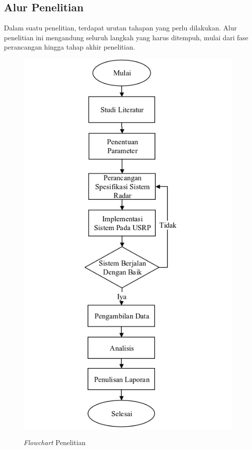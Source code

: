 \chapter{\babTiga}

\section{Alur Penelitian}
Dalam suatu penelitian, terdapat urutan tahapan yang perlu dilakukan. Alur penelitian ini mengandung seluruh langkah yang harus ditempuh, mulai dari fase perancangan hingga tahap akhir penelitian.
 \begin{figure}
	\begin{center}
		\includegraphics[scale=0.5]{pics/bab3/flowchart2.png} 
		\label{img:flowchart}
		\caption[\textit{Flowchart} Penelitian]{\textit{Flowchart} Penelitian}
	\end{center}
\end{figure}
